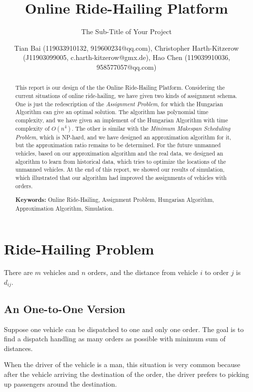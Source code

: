 \documentclass{llncs}
\title{Online Ride-Hailing Platform}
\subtitle{The Sub-Title of Your Project \vspace{-3mm}}
\author{Tian Bai (119033910132, 919600234@qq.com), Christopher Harth-Kitzerow (J11903099005, c.harth-kitzerow@gmx.de), Hao Chen (119039910036, 958577057@qq.com)}
\institute{Department of Computer Science, \\ Shanghai Jiao Tong University, Shanghai, China}
\begin{document}



\maketitle
\begin{abstract}\vspace{-5mm}
This report is our design of the the Online Ride-Hailing Platform. Considering the current situations of online ride-hailing, we have given two kinds of assignment schema. One is just the redescription of the \textit{Assignment Problem}, for which the Hungarian Algorithm can give an optimal solution. The algorithm has polynomial time complexity, and we have given an implement of the Hungarian Algorithm with time complexity of $O(n^4)$. The other is similar with the \textit{Minimum Makespan Scheduling Problem}, which is NP-hard, and we have designed an approximation algorithm for it, but the approximation ratio remains to be determined. For the future unmanned vehicles, based on our approximation algorithm and the real data, we designed an algorithm to learn from historical data, which tries to optimize the locations of the unmanned vehicles. At the end of this report, we showed our results of simulation, which illustrated that our algorithm had improved the assignments of vehicles with orders.

\textbf{Keywords:} Online Ride-Hailing, Assignment Problem, Hungarian Algorithm, Approximation Algorithm, Simulation.
\end{abstract}

\section{Ride-Hailing Problem}
There are $m$ vehicles and $n$ orders, and the distance from vehicle $i$ to order $j$ is $d_{ij}$.

\subsection{An One-to-One Version}
Suppose one vehicle can be dispatched to one and only one order. The goal is to find a dispatch handling as many orders as possible with minimum sum of distances.

When the driver of the vehicle is a man, this situation is very common because after the vehicle arriving the destination of the order, the driver prefers to picking up passengers around the destination.
\end{document}
